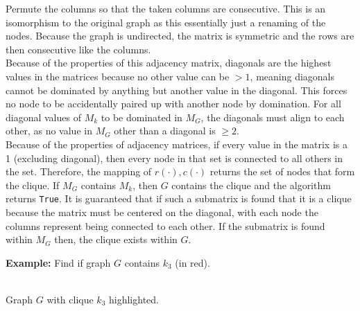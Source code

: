 \documentclass[11pt]{article}
\begin{document}
Permute the columns so that the taken columns are consecutive. This is an isomorphism to the original graph as this essentially just a renaming of the nodes. Because the graph is undirected, the matrix is symmetric and the rows are then consecutive like the columns.\\


Because of the properties of this adjacency matrix, diagonals are the highest values in the matrices because no other value can be $>1$, meaning diagonals cannot be dominated by anything but another value in the diagonal. This forces no node to be accidentally paired up with another node by domination. For all diagonal values of $M_k$ to be dominated in $M_G$, the diagonals must align to each other, as no value in $M_G$ other than a diagonal is $\geq 2$. \\


Because of the properties of adjacency matrices, if every value in the matrix is a 1 (excluding diagonal), then every node in that set is connected to all others in the set. Therefore, the mapping of $r(\cdot),c(\cdot)$ returns the set of nodes that form the clique. If $M_G$ contains $M_k$, then $G$ contains the clique and the algorithm returns \texttt{True}. It is guaranteed that if such a submatrix is found that it is a clique because the matrix must be centered on the diagonal, with each node the columns represent being connected to each other. If the submatrix is found within $M_G$ then, the clique exists within $G$. \lobtomb  \lobwatermark 



\pagebreak
\textbf{Example:} Find if graph $G$ contains $k_3$ (in red).\\
\begin{center}
\\



Graph $G$ with clique $k_3$ highlighted.
\end{center}
\end{document}
